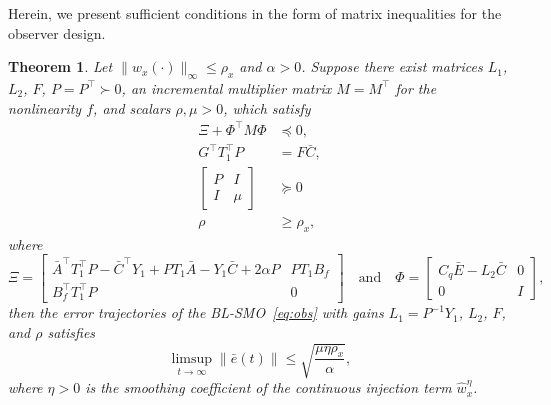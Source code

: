 \documentclass[times, doublespace]{rncauth}
\newtheorem{theorem}{Theorem}
\begin{document}
Herein, we present sufficient conditions in the form of matrix inequalities for the observer design.
\begin{theorem}\label{thm:obs_design}
Let $\|w_x(\cdot)\|_\infty\le \rho_{x}$ and $\alpha>0$. Suppose there exist matrices $L_1$, $L_2$, $F$, $P=P^\top\succ0$, an incremental multiplier matrix $M=M^\top$ for the nonlinearity $f$, and scalars $\rho, \mu>0$, which satisfy
	\begin{subequations}\label{eq:thm1}
		\begin{align}
		\Xi + \Phi^\top M \Phi &\preceq 0,\label{eq:thm1_a}\\
		G^\top T_1^\top P &= F \bar C,\label{eq:thm1_b}\\
		\begin{bmatrix} P & I \\ I & \mu \end{bmatrix} &\succeq 0\label{eq:thm1_c}\\
		\rho &\ge \rho_{x},
		\end{align}
	\end{subequations}
	where 
	\[
	\Xi = \begin{bmatrix}
		\bar A^\top T_1^\top P - \bar C^\top Y_1 + P T_1 \bar A - Y_1 \bar C + 2\alpha P & PT_1 B_f\\
		B_f^\top T_1^\top P & 0 
		\end{bmatrix} \quad \text{and} \quad 
	\Phi =\begin{bmatrix}
	C_q\bar E  - L_2 \bar C & 0 \\ 0 & I
	\end{bmatrix},
	\]
	then the error trajectories of the BL-SMO~\eqref{eq:obs} with gains $L_1 = P^{-1}Y_1$, $L_2$, $F$, and $\rho$ satisfies
	\begin{equation}\label{thm1:E}
	\limsup_{t\to\infty} \|\bar e(t)\|\le \sqrt{\frac{\mu\eta\rho_{x}}{\alpha}},
	\end{equation}
	where $\eta>0$ is the smoothing coefficient of the continuous injection term $\hat w^\eta_x$.
\end{theorem}
\end{document}
